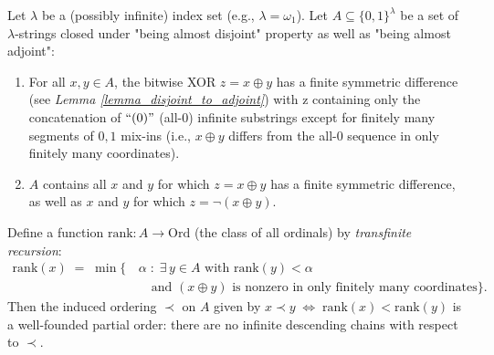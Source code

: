 \begin{lemma}\label{lemma_finite_diffs_wf}
    Let $\lambda$ be a (possibly infinite) index set (e.g., $\lambda = \omega_1$).  
    Let $A \subseteq \{0,1\}^\lambda$ be a set of $\lambda$-strings closed under "being almost disjoint" property as well as "being almost adjoint":
    \begin{enumerate}
    \item For all $x, y \in A$, the bitwise XOR $z = x \oplus y$ has a finite symmetric difference (see \textit{Lemma \ref{lemma_disjoint_to_adjoint}}) with z containing only the concatenation of $\text{``}(0)\text{''}$ (all-$0$) infinite substrings except for finitely many segments of ${0,1}$ mix-ins (i.e., $x \oplus y$ differs from the all-$0$ sequence in only finitely many coordinates).
    \item $A$ contains all $x$ and $y$ for which $z = x \oplus y$ has a finite symmetric difference, as well as $x$ and $y$ for which $z = \neg(x \oplus y)$.
    \end{enumerate}
    Define a function $\mathrm{rank}\colon A \to \mathrm{Ord}$ (the class of all ordinals) by \emph{transfinite recursion}:
    \begin{align*}
        \mathrm{rank}(x) \;=\;
        \min \bigl\{\,&
            \alpha \;:\; \exists\, y \in A \text{ with } \mathrm{rank}(y) < \alpha \\
            &\quad \text{and } (x \oplus y) \text{ is nonzero in only finitely many coordinates}
        \bigr\}.
    \end{align*}
    Then the induced ordering $\prec$ on $A$ given by $x \prec y \;\Longleftrightarrow\; \mathrm{rank}(x) < \mathrm{rank}(y)$ is a well-founded partial order: there are no infinite descending chains with respect to $\prec$.
\end{lemma}

